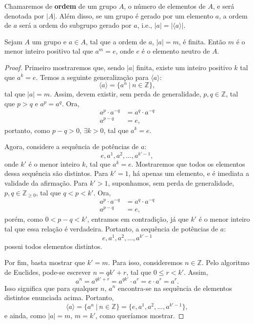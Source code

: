 \documentclass[11pt,openany]{book}
\newcommand{\gen}[1]{\ensuremath{\langle #1\rangle}}
\begin{document}
    \begin{definition}
    \label{def:ordem}
        Chamaremos de \textbf{ordem} de um grupo $A$, o número de elementos de $A$, e será denotada por $|A|$. Além disso, se um grupo é gerado por um elemento $a$, a ordem de $a$ será a ordem do subgrupo gerado por $a$, i.e., $|a| = |\gen{a}|$.
    \end{definition}


    \begin{theorem}
    \label{theor:ordem_finita_identidade}
        Sejam $A$ um grupo e $a \in A$, tal que a ordem de $a$, $|a| = m$, é finita. Então $m$ é o menor inteiro positivo tal que $a^m = e$, onde $e$ é o elemento neutro de $A$.
    \end{theorem}
    
    \begin{proof}
        Primeiro mostraremos que, sendo $|a|$ finita, existe um inteiro positivo $k$ tal que $a^k = e$. Temos a seguinte generalização para \gen{a}:
        \[\gen{a} = \{a^n \ | \ n \in \mathbb{Z}\},\]
        tal que $|a| = m$.
        Assim, devem existir, sem perda de generalidade, $p, q \in \mathbb{Z}$, tal que $p > q$ e $a^p = a^q$. Ora, 
        \begin{align*}
            a^p \cdot a^{-q} &= a^q \cdot a^{-q}\\
            a^{p-q} &= e,
        \end{align*}
        portanto, como $p-q > 0$, $\exists k > 0$, tal que $a^k = e$.

        Agora, considere a sequência de potências de $a$: 
        \[e, a^1, a^2, \dots, a^{k'-1},\]
        onde $k'$ é o menor inteiro $k$, tal que $a^k = e$. Mostraremos que todos os elementos dessa sequência são distintos. Para $k'= 1$, há apenas um elemento, e é imediata a validade da afirmação. Para $k' > 1$, suponhamos, sem perda de generalidade, $p, q \in \mathbb{Z}_{\geq 0}$, tal que $q < p < k'$. Ora,
        \begin{align*}
            a^p \cdot a^{-q} &= a^q \cdot a^{-q}\\
            a^{p-q} &= e,
        \end{align*}
        porém, como $0 < p - q < k'$, entramos em contradição, já que $k'$ é o menor inteiro tal que essa relação é verdadeira. Portanto, a sequência de potências de $a$: \[e, a^1, a^2, \dots, a^{k'-1}\] possui todos elementos distintos.

        Por fim, basta mostrar que $k' = m$. Para isso, consideremos $n \in \mathbb{Z}$. Pelo algoritmo de Euclides, pode-se escrever $n = qk'+r$, tal que $0 \leq r < k'$. Assim,
        \[a^n = a^{qk'+r} = a^{qk'}\cdot a^r = e\cdot a^r = a^r.\]
        Isso significa que para qualquer $n$, $a^n$ encontra-se na sequência de elementos distintos enunciada acima. Portanto,
        \[\gen{a} = \{a^n \ | \ n \in \mathbb{Z}\} = \{e, a^1, a^2, \dots, a^{k'-1}\},\]
        e ainda, como $|a| = m$, $m = k'$, como queríamos mostrar.
    \end{proof}
\end{document}
